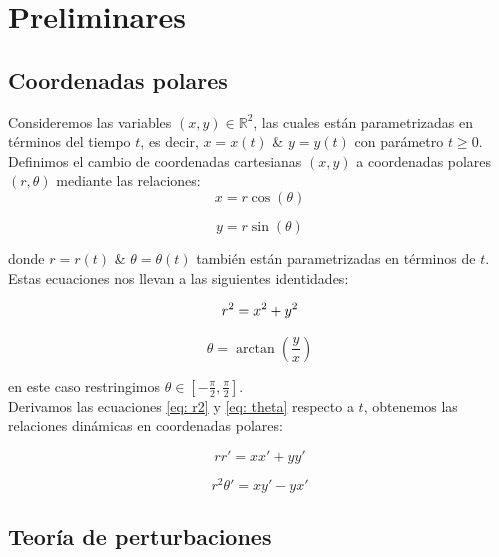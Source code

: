 \documentclass[12pt, a4paper]{report}
\begin{document}
\chapter{Preliminares}

\section{Coordenadas polares}

Consideremos las variables $(x,y)\in\mathbb{R}^2$, las cuales están parametrizadas en términos del tiempo $t$, es decir, $x=x(t)$ & $y=y(t)$ con parámetro $t\geq0$. Definimos el cambio de coordenadas cartesianas $(x,y)$
a coordenadas polares $(r,\theta)$  mediante las relaciones:
\begin{equation}\label{eq: xpolar}
	x=r\cos(\theta)
\end{equation}

\begin{equation}\label{eq: ypolar}
	y=r\sin(\theta)
\end{equation}

donde $r=r(t)$ & $\theta=\theta(t)$ también están parametrizadas en términos de $t$.\\

Estas ecuaciones nos llevan a las siguientes identidades:

\begin{equation}\label{eq: r2}
	r^2=x^2+y^2\\
\end{equation}

\begin{equation}\label{eq: theta}
	\theta=\arctan{(\frac{y}{x})}
\end{equation}

en este caso restringimos $\theta\in\left[-\frac{\pi}{2},\frac{\pi}{2}\right]$.\\

Derivamos las ecuaciones \eqref{eq: r2} y \eqref{eq: theta} respecto a $t$, obtenemos las relaciones dinámicas en coordenadas polares:

\begin{equation}\label{eq: drcart}
	rr'=xx'+yy'
\end{equation}

\begin{equation}\label{eq: dthetacart}
	r^2\theta'=xy'-yx'
\end{equation}

\newpage

\section{Teoría de perturbaciones}
\end{document}

